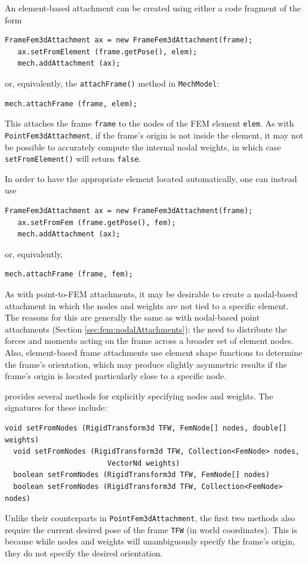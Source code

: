 An element-based attachment can be created using either a code fragment
of the form
%
\begin{lstlisting}[]
   FrameFem3dAttachment ax = new FrameFem3dAttachment(frame);
   ax.setFromElement (frame.getPose(), elem);
   mech.addAttachment (ax);
\end{lstlisting}
%
or, equivalently, the {\tt attachFrame()} method in {\tt MechModel}:
%
\begin{lstlisting}[]
   mech.attachFrame (frame, elem);
\end{lstlisting}
%
This attaches the frame {\tt frame} to the nodes of the FEM element
{\tt elem}. As with {\tt PointFem3dAttachment}, if the frame's origin
is not inside the element, it may not be possible to accurately
compute the internal nodal weights, in which case {\tt
setFromElement()} will return {\tt false}.

In order to have the appropriate element located automatically,
one can instead use
%
\begin{lstlisting}[]
   FrameFem3dAttachment ax = new FrameFem3dAttachment(frame);
   ax.setFromFem (frame.getPose(), fem);
   mech.addAttachment (ax);
\end{lstlisting}
%
or, equivalently, 
%
\begin{lstlisting}[]
   mech.attachFrame (frame, fem);
\end{lstlisting}
%

As with point-to-FEM attachments, it may be desirable to create a
nodal-based attachment in which the nodes and weights are not tied to
a specific element. The reasons for this are generally the same as
with nodal-based point attachments (Section
\ref{sec:fem:nodalAttachments}): the need to distribute the forces and
moments acting on the frame across a broader set of element nodes.
Also, element-based frame attachments use element shape functions to
determine the frame's orientation, which may produce slightly
asymmetric results if the frame's origin is located particularly close
to a specific node.

 provides
several methods for explicitly specifying nodes and weights. The
signatures for these include:
\begin{lstlisting}[]
  void setFromNodes (RigidTransform3d TFW, FemNode[] nodes, double[] weights)
  void setFromNodes (RigidTransform3d TFW, Collection<FemNode> nodes, 
                        VectorNd weights)
  boolean setFromNodes (RigidTransform3d TFW, FemNode[] nodes)
  boolean setFromNodes (RigidTransform3d TFW, Collection<FemNode> nodes)
\end{lstlisting}
Unlike their counterparts in {\tt PointFem3dAttachment}, the first two
methods also require the current desired pose of the frame {\tt TFW}
(in world coordinates).  This is because while nodes and weights will
unambiguously specify the frame's origin, they do not specify the
desired orientation.

